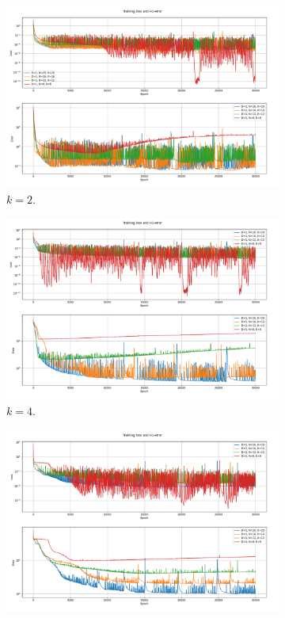 \begin{figure}[h!]
    \centering
    \begin{subfigure}[b]{0.48\textwidth}
        \includegraphics[width=\textwidth]{img/VPINN-Comparison-k2increaseNK.png}
        \caption{$k=2$.}
        \label{fig:vpinnsk2increaseNK}
    \end{subfigure}
    \hfill
    \begin{subfigure}[b]{0.48\textwidth}
        \includegraphics[width=\textwidth]{img/VPINN-Comparison-k4increaseNK.png}
        \caption{$k=4$.}
        \label{fig:vpinnsk4increaseNK}
    \end{subfigure}
    \vfill
    \begin{subfigure}[b]{0.48\textwidth}
        \includegraphics[width=\textwidth]{img/VPINN-Comparison-k6increaseNK.png}

\end{subfigure}
\end{figure}
